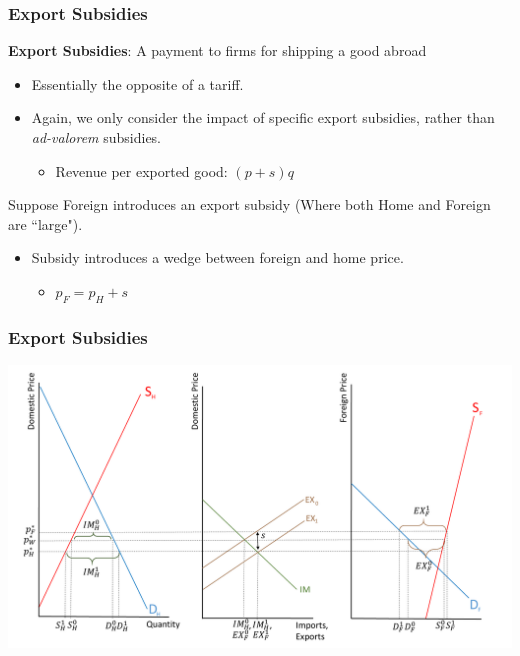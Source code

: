 \documentclass{beamer}
\begin{document}
\begin{frame}
	\frametitle{Export Subsidies}
	\textbf{Export Subsidies}: A payment to firms for shipping a good abroad
	\begin{itemize}
		\item Essentially the opposite of a tariff.
		\item Again, we only consider the impact of specific export subsidies, rather than \emph{ad-valorem} subsidies.
		\begin{itemize}
			\item Revenue per exported good: $(p+s)q$
		\end{itemize}
	\end{itemize}
	
	Suppose Foreign introduces an export subsidy (Where both Home and Foreign are ``large").
	\begin{itemize}
		\item Subsidy introduces a wedge between foreign and home price.
		\begin{itemize}
			\item $p_F=p_H+s$
		\end{itemize}
	\end{itemize}
	
\end{frame}

\begin{frame}
	\frametitle{Export Subsidies}
	
	\includegraphics[scale=0.3]{SL_23.pdf}
	
\end{frame}
\end{document}
